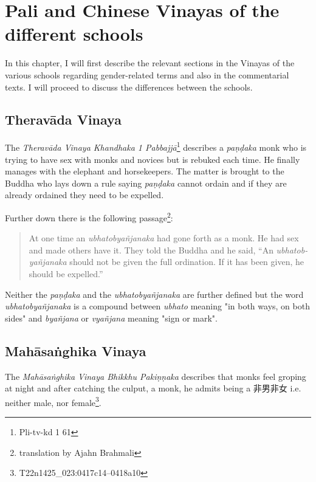 \section{Pali and Chinese Vinayas of the different schools}

In this chapter, I will first describe the relevant sections in the Vinayas of the various schools regarding gender-related terms and also in the commentarial texts. I will proceed to discuss the differences between the schools.

\subsection{Theravāda Vinaya}

The {\em Theravāda Vinaya Khandhaka 1 Pabbajjā}\footnote{Pli-tv-kd 1 61} describes a {\em paṇḍaka} monk who is trying to have sex with monks and novices but is rebuked each time. He finally manages with the elephant and horsekeepers. The matter is brought to the Buddha who lays down a rule saying {\em paṇḍaka} cannot ordain and if they are already ordained they need to be expelled.

Further down there is the following passage\footnote{translation by Ajahn Brahmali}:

\begin{quote}
At one time an {\em ubhatob­yañ­janaka} had gone forth as a monk. He had sex and made others have it. They told the Buddha and he said, “An {\em ubhatob­yañ­janaka} should not be given the full ordination. If it has been given, he should be expelled.”
\end{quote}

Neither the {\em paṇḍaka} and the {\em ubhatob­yañ­janaka} are further defined but the word {\em ubhatob­yañ­janaka} is a compound between {\em ubhato} meaning "in both ways, on both sides" and {\em byañjana} or {\em vyañjana} meaning "sign or mark".


\subsection{Mahāsaṅghika Vinaya}
The {\em Mahāsaṅghika Vinaya Bhikkhu Pakiṇṇaka} describes that monks feel groping at night and after catching the culput, a monk, he admits being a 非男非女 i.e. neither male, nor female\footnote{T22n1425_023:0417c14–0418a10}.


